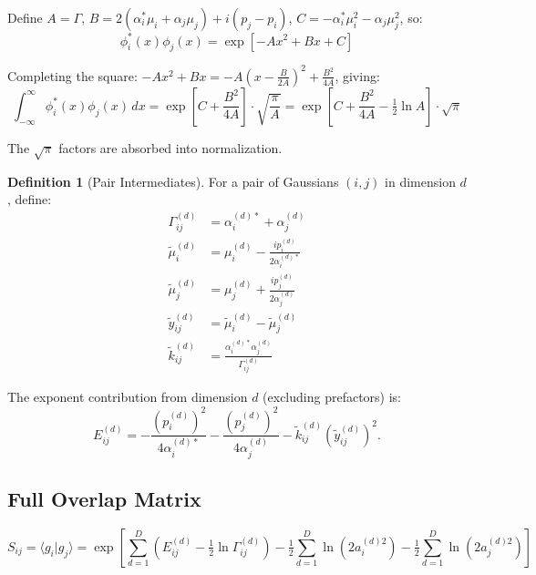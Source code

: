 \documentclass[11pt,a4paper]{article}
\newcommand{\half}{\tfrac{1}{2}}
\theoremstyle{definition}
\newtheorem{definition}{Definition}
\begin{document}
Define $A = \Gamma$, $B = 2(\alpha_i^*\mu_i + \alpha_j\mu_j) + i(p_j - p_i)$, $C = -\alpha_i^*\mu_i^2 - \alpha_j\mu_j^2$, so:
\begin{equation}
\phi_i^*(x)\phi_j(x) = \exp\left[ -Ax^2 + Bx + C \right]
\end{equation}

Completing the square: $-Ax^2 + Bx = -A\left(x - \frac{B}{2A}\right)^2 + \frac{B^2}{4A}$, giving:
\begin{equation}
\int_{-\infty}^{\infty} \phi_i^*(x)\phi_j(x)\,dx = \exp\left[C + \frac{B^2}{4A}\right] \cdot \sqrt{\frac{\pi}{A}} = \exp\left[C + \frac{B^2}{4A} - \half\ln A\right] \cdot \sqrt{\pi}
\end{equation}

The $\sqrt{\pi}$ factors are absorbed into normalization.

\begin{definition}[Pair Intermediates]
For a pair of Gaussians $(i, j)$ in dimension $d$, define:
\begin{align}
\Gamma_{ij}^{(d)} &= \alpha_i^{(d)*} + \alpha_j^{(d)} \label{eq:Gamma} \\[0.3em]
\tilde{\mu}_i^{(d)} &= \mu_i^{(d)} - \frac{i p_i^{(d)}}{2 \alpha_i^{(d)*}} \\[0.3em]
\tilde{\mu}_j^{(d)} &= \mu_j^{(d)} + \frac{i p_j^{(d)}}{2 \alpha_j^{(d)}} \\[0.3em]
\tilde{y}_{ij}^{(d)} &= \tilde{\mu}_i^{(d)} - \tilde{\mu}_j^{(d)} \\[0.3em]
\tilde{k}_{ij}^{(d)} &= \frac{\alpha_i^{(d)*} \alpha_j^{(d)}}{\Gamma_{ij}^{(d)}}
\end{align}
\end{definition}

The exponent contribution from dimension $d$ (excluding prefactors) is:
\begin{equation}
E_{ij}^{(d)} = -\frac{(p_i^{(d)})^2}{4\alpha_i^{(d)*}} - \frac{(p_j^{(d)})^2}{4\alpha_j^{(d)}} - \tilde{k}_{ij}^{(d)} (\tilde{y}_{ij}^{(d)})^2.
\end{equation}

\subsection{Full Overlap Matrix}

\begin{tcolorbox}[colback=blue!5,colframe=blue!50!black,title=Overlap Matrix $S$]
\begin{equation}
S_{ij} = \langle g_i | g_j \rangle = \exp\left[ \sum_{d=1}^{D} \left( E_{ij}^{(d)} - \half \ln \Gamma_{ij}^{(d)} \right) - \half \sum_{d=1}^{D} \ln(2 a_i^{(d)2}) - \half \sum_{d=1}^{D} \ln(2 a_j^{(d)2}) \right]
\end{equation}
\end{tcolorbox}
\end{document}
